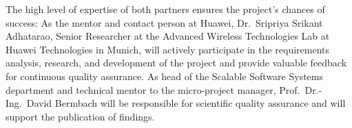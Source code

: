 The high level of expertise of both partners ensures the project's chances of success:
As the mentor and contact person at Huawei, Dr.~Sripriya Srikant Adhatarao, Senior Researcher at the Advanced Wireless Technologies Lab at Huawei Technologies in Munich, will actively participate in the requirements analysis, research, and development of the project and provide valuable feedback for continuous quality assurance.
As head of the Scalable Software Systems department and technical mentor to the micro-project manager, Prof.~Dr.-Ing.~David Bermbach will be responsible for scientific quality assurance and will support the publication of findings.

